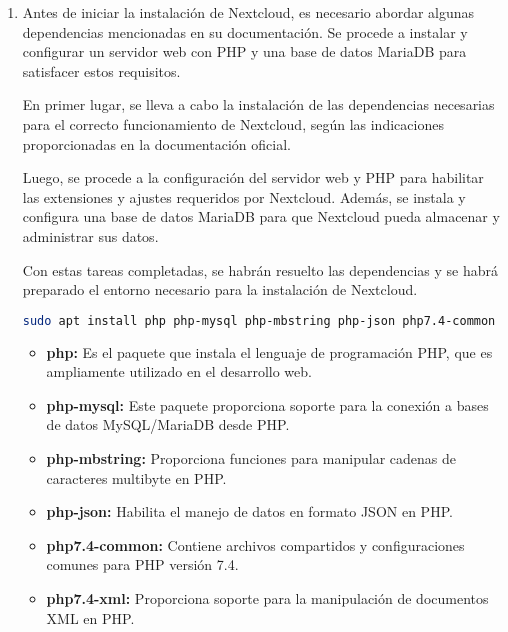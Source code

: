\begin{enumerate}
				\item Antes de iniciar la instalación de Nextcloud, es necesario abordar algunas dependencias mencionadas en su documentación. Se procede a instalar y configurar un servidor web con PHP y una base de datos MariaDB para satisfacer estos requisitos.
				
				En primer lugar, se lleva a cabo la instalación de las dependencias necesarias para el correcto funcionamiento de Nextcloud, según las indicaciones proporcionadas en la documentación oficial.
				
				Luego, se procede a la configuración del servidor web y PHP para habilitar las extensiones y ajustes requeridos por Nextcloud. Además, se instala y configura una base de datos MariaDB para que Nextcloud pueda almacenar y administrar sus datos.
				
				Con estas tareas completadas, se habrán resuelto las dependencias y se habrá preparado el entorno necesario para la instalación de Nextcloud. 
				
				
				
				\begin{lstlisting}[language=Bash,caption=Instalación de dependecias]
	sudo apt install php php-mysql php-mbstring php-json php7.4-common php7.4-xml php-zip php-gd curl php-curl php-pear php7.4-opcache php-intl mariadb-server
				\end{lstlisting}
			
				\begin{itemize}
					\item \textbf{php:} Es el paquete que instala el lenguaje de programación PHP, que es ampliamente utilizado en el desarrollo web.
					
					\item \textbf{php-mysql:} Este paquete proporciona soporte para la conexión a bases de datos MySQL/MariaDB desde PHP.
					
					\item \textbf{ php-mbstring:} Proporciona funciones para manipular cadenas de caracteres multibyte en PHP.
					
					\item \textbf{php-json:} Habilita el manejo de datos en formato JSON en PHP.
					
					\item \textbf{php7.4-common:} Contiene archivos compartidos y configuraciones comunes para PHP versión 7.4.
					
					\item \textbf{php7.4-xml:} Proporciona soporte para la manipulación de documentos XML en PHP.
					

\end{itemize}
\end{enumerate}
